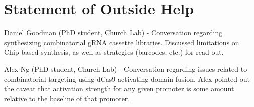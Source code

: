 \documentclass[10pt]{article}
\begin{document}
\pagebreak




\section*{Statement of Outside Help}

\noindent Daniel Goodman (PhD student, Church Lab) - Conversation regarding synthesizing combinatorial gRNA cassette libraries. Discussed limitations on Chip-based synthesis, as well as strategies (barcodes, etc.) for read-out.
\newline

\noindent Alex Ng (PhD student, Church Lab) - Conversation regarding issues related to combinatorial targeting using dCas9-activating domain fusion. Alex pointed out the caveat that activation strength for any given promoter is some amount relative to the baseline of that promoter.
\newline
\end{document}
